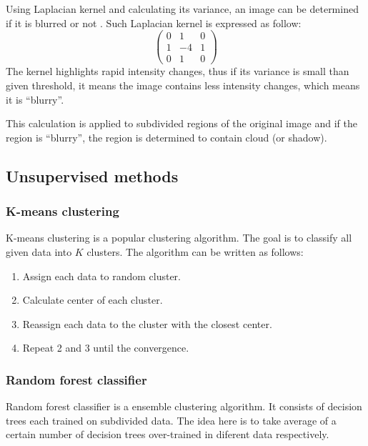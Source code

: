 \documentclass{article}
\begin{document}
            Using Laplacian kernel and calculating its variance,
            an image can be determined if it is blurred or not \cite{blur}.
            Such Laplacian kernel is expressed as follow:
            \begin{equation*}
                \begin{pmatrix}
                    0 & 1 & 0  \\
                    1 & -4 & 1 \\
                    0 & 1 & 0
                \end{pmatrix}
            \end{equation*}
            The kernel highlights rapid intensity changes,
            thus if its variance is small than given threshold,
            it means the image contains less intensity changes,
            which means it is ``blurry''.

            This calculation is applied to subdivided regions of the original image
            and if the region is ``blurry'',
            the region is determined to contain cloud (or shadow).

    \subsection{Unsupervised methods}
        \subsubsection{K-means clustering}
            K-means clustering \cite{kmeans} is a popular clustering algorithm.
            The goal is to classify all given data into $K$ clusters.
            The algorithm can be written as follows:
            \begin{enumerate}
                \item Assign each data to random cluster.
                \item Calculate center of each cluster.
                \item Reassign each data to the cluster with the closest center.
                \item Repeat 2 and 3 until the convergence.
            \end{enumerate}

        \subsubsection{Random forest classifier}
            Random forest classifier \cite{random} is a ensemble clustering algorithm.
            It consists of decision trees each trained on subdivided data.
            The idea here is to take average of a certain number of decision trees
            over-trained in diferent data respectively.
\end{document}
